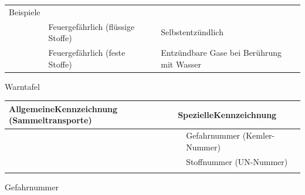 \documentclass{article}
\begin{document}
\begin{flushleft}
\tablehead{}\begin{supertabular}{m{2.1599998cm}m{4.289cm}m{2.1599998cm}m{4.2840004cm}}
\centering Beispiele\par

 &
 &
 &
\\
 \par

 &
Feuergef\"ahrlich (fl\"ussige Stoffe)

 &
 \par

 &
Selbstentz\"undlich

\\
 \par

 &
Feuergef\"ahrlich (feste Stoffe)

 &
 \par

 &
Entz\"undbare Gase bei Ber\"uhrung mit Wasser

\\
\end{supertabular}
\end{flushleft}
Warntafel

\begin{center}
\begin{tabular}{|m{3.225cm}m{3.225cm}|m{3.225cm}m{3.225cm}|}
\hline
\multicolumn{2}{|m{6.65cm}|}{\centering AllgemeineKennzeichnung
(Sammeltransporte)\par

} &
\multicolumn{2}{m{6.65cm}|}{\centering SpezielleKennzeichnung\par

}\\\hline
{}\par

 &
 &
\par

 &
Gefahrnummer  (Kemler-Nummer)

\\\hline
 &
 &
 &
Stoffnummer  (UN-Nummer)

\\\hhline{~~~-}
\end{tabular}
\end{center}
Gefahrnummer
\end{document}
